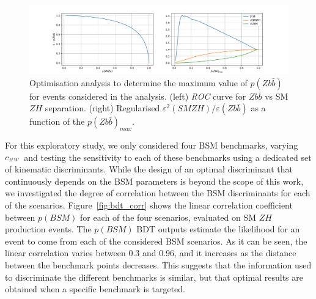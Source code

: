\begin{figure}
\centering
\includegraphics[width=\textwidth]{plots/bkg_cut_opt.pdf}
\caption{
\label{fig:s2_over_b}
Optimisation analysis to determine the maximum value of $p(Z b\bar{b})$ for events
considered in the analysis. (left) {\it ROC} curve for $Z b\bar{b}$ vs SM $Z H$
separation. (right) Regularised $\varepsilon^2(SM Z H) /
\varepsilon(Zb\bar{b})$ as a function of the $p(Z b\bar{b})_{max}$.
}
\end{figure}

For this exploratory study, we only considered four BSM benchmarks, varying $c_{\scriptscriptstyle HW}$ and testing the
sensitivity to each of these benchmarks using a dedicated set of kinematic
discriminants. While the design of an optimal discriminant that continuously depends on
the BSM parameters is beyond the scope of this work, we investigated the degree of
correlation between the BSM discriminants for each of the scenarios.
Figure~\ref{fig:bdt_corr} shows the linear correlation coefficient between $p(BSM)$ for
each of the four scenarios, evaluated on SM $Z H$ production events. The $p(BSM)$
BDT outputs estimate the likelihood for an event to come from each of the considered BSM
scenarios.
As it can be seen,
the linear correlation varies between 0.3 and 0.96, and it increases as the distance
between the benchmark points decreases. This suggests that the information used to
discriminate the different benchmarks is similar, but that optimal results are obtained
when a specific benchmark is targeted.

%


